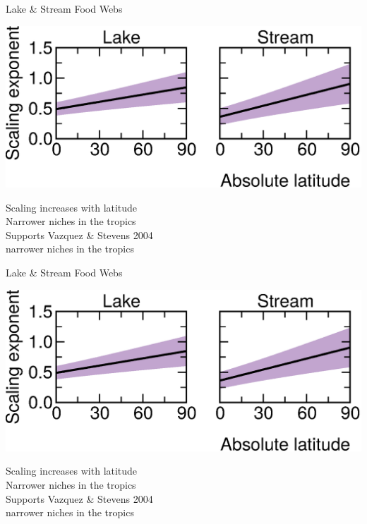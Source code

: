 \documentclass{beamer}
\begin{document}
  \begin{frame}{Lake \& Stream Food Webs}
    \begin{center}
      \includegraphics*[width=.9\textwidth]{Figures/results/effect_mod.eps}

      \vspace{1cm}
      Scaling increases with latitude\\
      {\color{white} Narrower niches in the tropics\\
      \vspace{.54cm}      
      Supports Vazquez \& Stevens 2004\\}
      {\color{white} narrower niches in the tropics}

    \end{center}
  \end{frame}


  \begin{frame}{Lake \& Stream Food Webs}
    \begin{center}
      \includegraphics*[width=.9\textwidth]{Figures/results/effect_mod.eps}

      \vspace{1cm}
      Scaling increases with latitude\\
      Narrower niches in the tropics\\
      \vspace{.54cm}     
      {\color{white} Supports Vazquez \& Stevens 2004\\}
      {\color{white} narrower niches in the tropics}

    \end{center}
  \end{frame}
\end{document}
